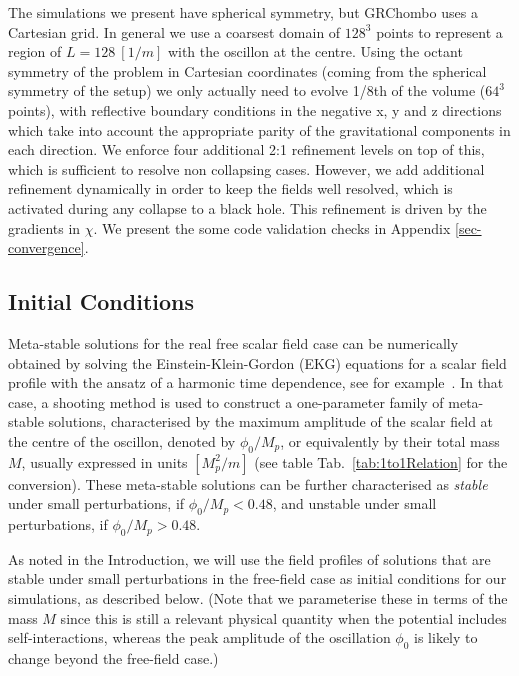 \documentclass[11pt,a4paper]{article}
\begin{document}
The simulations we present have spherical symmetry, but GRChombo uses a Cartesian grid. In general we use a coarsest domain of $128^3$ points to represent a region of $L = 128 ~ [1/m]$ with the oscillon at the centre. Using the octant symmetry of the problem in Cartesian coordinates (coming from the spherical symmetry of the setup) we only actually need to evolve 1/8th of the volume ($64^3$ points), with reflective boundary conditions in the negative x, y and z directions which take into account the appropriate parity of the gravitational components in each direction. We enforce four additional 2:1 refinement levels on top of this, which is sufficient to resolve non collapsing cases. However, we add additional refinement dynamically in order to keep the fields well resolved, which is activated during any collapse to a black hole. This refinement is driven by the gradients in $\chi$. We present the some code validation checks in Appendix \ref{sec-convergence}.

\subsection{Initial Conditions}
\label{sec:InitialConditions}

Meta-stable solutions for the real free scalar field case can be numerically obtained by solving the Einstein-Klein-Gordon (EKG) equations for a scalar field profile with the ansatz of a harmonic time dependence, see for example~\cite{UrenaLopez:2002gx, 1609.04724}. In that case, a shooting method is used to construct a one-parameter family of meta-stable solutions, characterised by the maximum amplitude of the scalar field at the centre of the oscillon, denoted by $\phi_0/M_p$, or equivalently by their total mass $M$, usually expressed in units $[M_p^2/m]$ (see table Tab.~\ref{tab:1to1Relation} for the conversion). These meta-stable solutions can be further characterised as \textit{stable} under small perturbations, if $\phi_0/M_p < 0.48$, and unstable under small perturbations, if $\phi_0/M_p > 0.48$.  

As noted in the Introduction, we will use the field profiles of solutions that are stable under small perturbations in the free-field case as initial conditions for our simulations, as described below. (Note that we parameterise these in terms of the mass $M$ since this is still a relevant physical quantity when the potential includes self-interactions, whereas the peak amplitude of the oscillation $\phi_0$ is likely to change beyond the free-field case.)
\end{document}

